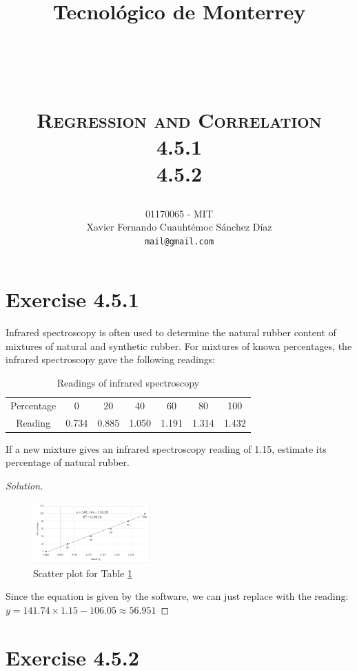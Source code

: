 \documentclass[titlepage, letterpaper, fleqn]{article}
\title{
\vspace{1in}
\textbf{Tecnológico de Monterrey} \\
\vspace{0.5in}
\textmd{\mahclass} \\
\large{\textit{\mahteacher}} \\
\vspace{0.5in}
\textsc{\mahtitle}\\
\textsc{Regression and Correlation}\\
\textsc{4.5.1}\\
\textsc{4.5.2}\\
\author{01170065  - MIT \\
Xavier Fernando Cuauhtémoc Sánchez Díaz \\
\texttt{mail@gmail.com}}
\date{\mahdate}
}
\renewcommand\qedsymbol{\(\blacksquare\)}
\newenvironment{solution}
{\renewcommand\qedsymbol{$\square$}\begin{proof}[Solution]}
{\end{proof}}
\begin{document}
\begin{titlepage}
\maketitle
\end{titlepage}

%
%

\section{Exercise 4.5.1}

{\large Infrared spectroscopy is often used to determine the natural rubber content of mixtures of natural and synthetic rubber.
For mixtures of known percentages, the infrared spectroscopy gave the following readings:}

\begin{table}[h!]
\centering
\begin{tabular}{@{}ccccccc@{}}
\toprule
Percentage & 0 & 20 & 40 & 60 & 80 & 100 \\
Reading & 0.734 & 0.885 & 1.050 & 1.191 & 1.314 & 1.432 \\ \bottomrule
\end{tabular}
\caption{Readings of infrared spectroscopy}
\label{tab4.5.1}
\end{table}

{\large If a new mixture gives an infrared spectroscopy reading of 1.15, estimate its percentage of natural rubber.}

\begin{solution}
\begin{figure}[h!]
	\centering
	\includegraphics[width=0.4\textwidth]{img_4_5_1}
	\caption{Scatter plot for Table \ref{tab4.5.1}}
	\label{fig:4.5.1}
\end{figure}
Since the equation is given by the software, we can just replace with the reading: $y = 141.74 \times 1.15 - 106.05 \approx 56.951$
\end{solution}

\pagebreak

\section{Exercise 4.5.2}
\end{document}
